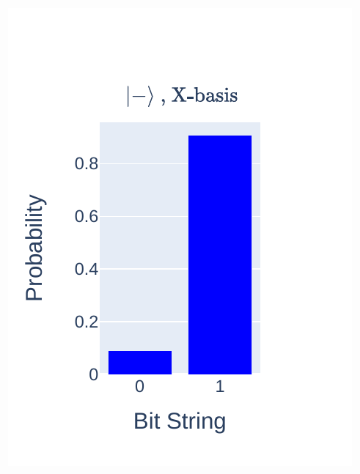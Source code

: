\documentclass[journal]{IEEEtran}
\begin{document}
\begin{figure}
\begin{subfigure}{0.25\textwidth}
        \includegraphics[scale=0.8, trim={10 20 10 25 }, clip]{figures/state_teleport/minus_x_results.pdf}
    \end{subfigure}
    \begin{subfigure}{0.2\textwidth}
        \centering

\end{subfigure}
\end{figure}
\end{document}
